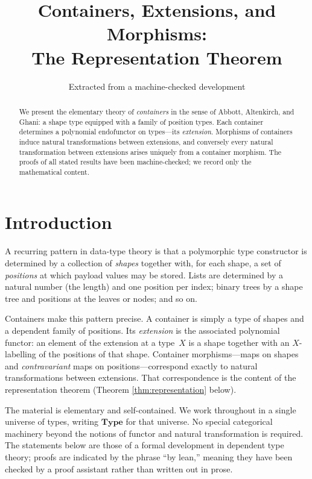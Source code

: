 \documentclass[11pt,a4paper]{article}
\title{Containers, Extensions, and Morphisms:\\
  The Representation Theorem}
\author{Extracted from a machine-checked development}
\date{}
\theoremstyle{plain}
\theoremstyle{definition}
\newcommand{\Type}{\mathbf{Type}}
\begin{document}
\maketitle

\begin{abstract}
We present the elementary theory of \emph{containers} in the sense of Abbott,
Altenkirch, and Ghani: a shape type equipped with a family of position types.
Each container determines a polynomial endofunctor on types---its
\emph{extension}. Morphisms of containers induce natural transformations
between extensions, and conversely every natural transformation between
extensions arises uniquely from a container morphism. The proofs of all stated
results have been machine-checked; we record only the mathematical content.
\end{abstract}

\tableofcontents
\bigskip

\section{Introduction}

A recurring pattern in data-type theory is that a polymorphic type constructor
is determined by a collection of \emph{shapes} together with, for each shape,
a set of \emph{positions} at which payload values may be stored. Lists are
determined by a natural number (the length) and one position per index; binary
trees by a shape tree and positions at the leaves or nodes; and so on.

Containers make this pattern precise. A container is simply a type of shapes
and a dependent family of positions. Its \emph{extension} is the associated
polynomial functor: an element of the extension at a type~$X$ is a shape
together with an $X$-labelling of the positions of that shape. Container
morphisms---maps on shapes and \emph{contravariant} maps on
positions---correspond exactly to natural transformations between extensions.
That correspondence is the content of the representation theorem (Theorem
\ref{thm:representation} below).

The material is elementary and self-contained. We work throughout in a single
universe of types, writing $\Type$ for that universe. No special categorical
machinery beyond the notions of functor and natural transformation is
required. The statements below are those of a formal development in dependent
type theory; proofs are indicated by the phrase ``by lean,'' meaning they have
been checked by a proof assistant rather than written out in prose.
\end{document}
